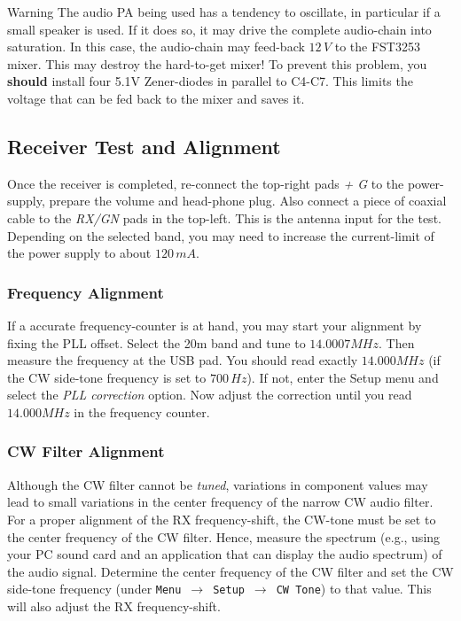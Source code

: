 \documentclass[10pt, a4paper,twoside]{scrartcl}
\newenvironment{warning}{\begin{bclogo}[couleur=red!30,arrondi=.1,logo=\bcattention,ombre=true]{Warning}}{\end{bclogo}}
\begin{document}
\begin{warning}
The audio PA being used has a tendency to oscillate, in particular if a small speaker is used. If it does so, it may drive the complete audio-chain into saturation. In this case, the audio-chain may feed-back $12\,V$ to the FST3253 mixer. This may destroy the hard-to-get mixer! To prevent this problem, you \textbf{should} install four 5.1V Zener-diodes in parallel to C4-C7. This limits the voltage that can be fed back to the mixer and saves it. 
\end{warning}

\subsection{Receiver Test and Alignment}
Once the receiver is completed, re-connect the top-right pads \emph{+ G} to the power-supply, prepare the volume and head-phone plug. Also connect a piece of coaxial cable to the \emph{RX/GN} pads in the top-left. This is the antenna input for the test. Depending on the selected band, you may need to increase the current-limit of the power supply to about $120\,mA$. 

\subsubsection{Frequency Alignment}
If a accurate frequency-counter is at hand, you may start your alignment by fixing the PLL offset. Select the 20m band and tune to $14.0007 MHz$. Then measure the frequency at the USB pad. You should read exactly $14.000 MHz$ (if the CW side-tone frequency is set to $700\,Hz$). If not, enter the Setup menu and select the \emph{PLL correction} option. Now adjust the correction until you read $14.000 MHz$ in the frequency counter.

\subsubsection{CW Filter Alignment}
Although the CW filter cannot be \emph{tuned}, variations in component values may lead to small variations in the center frequency of the narrow CW audio filter. For a proper alignment of the RX frequency-shift, the CW-tone must be set to the center frequency of the CW filter. Hence, measure the spectrum (e.g., using your PC sound card and an application that can display the audio spectrum) of the audio signal. Determine the center frequency of the CW filter and set the CW side-tone frequency (under \texttt{Menu}\ $\rightarrow$\ \texttt{Setup}\ $\rightarrow$\ \texttt{CW Tone}) to that value. This will also adjust the RX frequency-shift.
\end{document}
